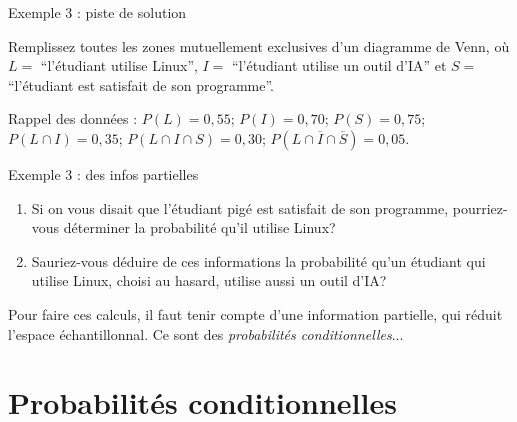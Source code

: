 \documentclass{BeamerTemplate}
\newcommand{\cibleReponse}{}
\newcommand{\lienreponse}[1]{\gdef\cibleReponse{#1}}
\begin{document}
\begin{frame}[t]{Exemple 3 : piste de solution}

{\small
 Remplissez toutes les zones mutuellement exclusives d'un diagramme de Venn, où
 $L=$ \enquote{l'étudiant utilise Linux}, $I=$ \enquote{l'étudiant utilise un outil d'IA}
 et $S=$ \enquote{l'étudiant est satisfait de son programme}.

 \medskip
 Rappel des données : $P(L)=0{,}55$; $P(I)=0{,}70$; $P(S)=0{,}75$; $P(L\cap I)=0{,}35$; $P(L\cap I\cap S)=0{,}30$; $P(L\cap \overline{I}\cap \overline{S})=0{,}05$.
}

\begin{center}
\end{center}
\end{frame}
\begin{frame}[t]{Exemple 3 : des infos partielles}
\begin{enumerate}
\item[(vii)] Si on vous disait que l'étudiant pigé est satisfait de son programme, pourriez-vous déterminer la probabilité qu'il utilise Linux?

\vspace{1.3cm}

\item[(viii)] Sauriez-vous déduire de ces informations la probabilité qu'un étudiant qui utilise Linux, choisi au hasard, utilise aussi un outil d'IA?

\vspace{1.3cm}
\end{enumerate}

Pour faire ces calculs, il faut tenir compte d'une information partielle, qui réduit l'espace échantillonnal. Ce sont des \textit{probabilités conditionnelles}...

\lienreponse{rep-ex1}
\end{frame}

\section{Probabilités conditionnelles}
\end{document}
